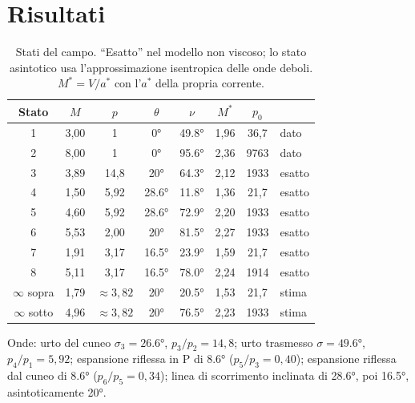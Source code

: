 \documentclass[11pt,a4paper]{article}
\begin{document}
\section{Risultati}
\begin{table}[H]
  \centering
  \small
  \begin{tabular}{cccccccl}
    \toprule
    Stato & $M$ & $p$ & $\theta$ & $\nu$ & $M^*$ & $p_0$ & \\
    \midrule
    1 & 3,00 & 1 & \ang{0} & \ang{49.8} & 1,96 & 36,7 & dato \\
    2 & 8,00 & 1 & \ang{0} & \ang{95.6} & 2,36 & 9763 & dato \\
    3 & 3,89 & 14,8 & \ang{20} & \ang{64.3} & 2,12 & 1933 & esatto \\
    4 & 1,50 & 5,92 & \ang{28.6} & \ang{11.8} & 1,36 & 21,7 & esatto \\
    5 & 4,60 & 5,92 & \ang{28.6} & \ang{72.9} & 2,20 & 1933 & esatto \\
    6 & 5,53 & 2,00 & \ang{20} & \ang{81.5} & 2,27 & 1933 & esatto \\
    7 & 1,91 & 3,17 & \ang{16.5} & \ang{23.9} & 1,59 & 21,7 & esatto \\
    8 & 5,11 & 3,17 & \ang{16.5} & \ang{78.0} & 2,24 & 1914 & esatto \\
    $\infty$ sopra & 1,79 & $\approx3{,}82$ & \ang{20} & \ang{20.5} & 1,53 & 21,7 & stima \\
    $\infty$ sotto & 4,96 & $\approx3{,}82$ & \ang{20} & \ang{76.5} & 2,23 & 1933 & stima \\
    \bottomrule
  \end{tabular}
  \caption{Stati del campo. ``Esatto'' nel modello non viscoso; lo stato asintotico usa l'approssimazione
  isentropica delle onde deboli. $M^*=V/a^*$ con l'$a^*$ della propria corrente.}
\end{table}
Onde: urto del cuneo $\sigma_3=\ang{26.6}$, $p_3/p_2=14{,}8$; urto trasmesso $\sigma=\ang{49.6}$, $p_4/p_1=5{,}92$;
espansione riflessa in P di \ang{8.6} ($p_5/p_3=0{,}40$); espansione riflessa dal cuneo di \ang{8.6}
($p_6/p_5=0{,}34$); linea di scorrimento inclinata di \ang{28.6}, poi \ang{16.5}, asintoticamente \ang{20}.

\end{document}
